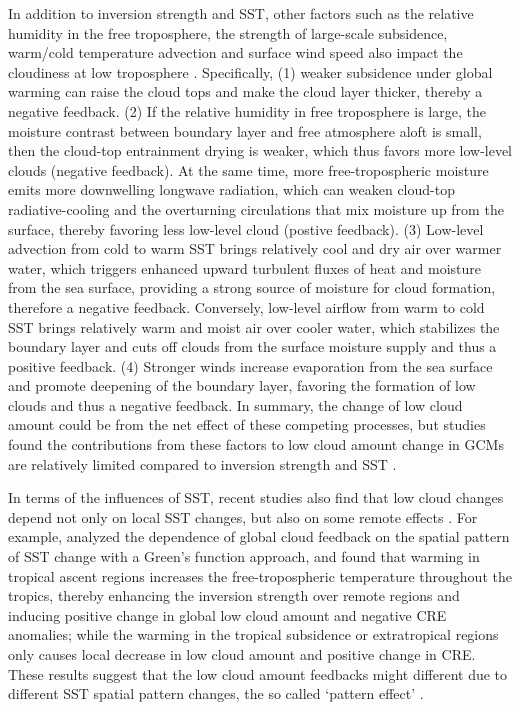 In addition to inversion strength and SST, other factors such as the relative humidity in the free troposphere, the strength of large-scale subsidence, warm/cold temperature advection and surface wind speed also impact the cloudiness at low troposphere \citep[e.g.,][]{Bretherton2015,Scott2020}. Specifically, (1) weaker subsidence under global warming can raise the cloud tops and make the cloud layer thicker, thereby a negative feedback. (2) If the relative humidity in free troposphere is large, the moisture contrast between boundary layer and free atmosphere aloft is small, then the cloud-top entrainment drying is weaker, which thus favors more low-level clouds (negative feedback). At the same time, more free-tropospheric moisture emits more downwelling longwave radiation, which can weaken cloud-top radiative-cooling and the overturning circulations that mix moisture up from the surface, thereby favoring less low-level cloud (postive feedback). (3) Low-level advection from cold to warm SST brings relatively cool and dry air over warmer water, which triggers enhanced upward turbulent fluxes of heat and moisture from the sea surface, providing a strong source of moisture for cloud formation, therefore a negative feedback. Conversely, low-level airflow from warm to cold SST brings relatively warm and moist air over cooler water, which stabilizes the boundary layer and cuts off clouds from the surface moisture supply and thus a positive feedback. (4) Stronger winds increase evaporation from the sea surface and promote deepening of the boundary layer, favoring the formation of low clouds and thus a negative feedback. In summary, the change of low cloud amount could be from the net effect of these competing processes, but studies found the contributions from these factors to low cloud amount change in GCMs are relatively limited compared to inversion strength and SST \citep{Myers2016,Scott2020}.

In terms of the influences of SST, recent studies also find that low cloud changes depend not only on local SST changes, but also on some remote effects \citep[e.g.,][]{Zhou2015,Zhou2016,Zhou2017,Mauritsen2016clouds,Andrews2018}. For example, \cite{Zhou2017} analyzed the dependence of global cloud feedback on the spatial pattern of SST change with a Green's function approach, and found that warming in tropical ascent regions increases the free-tropospheric temperature throughout the tropics, thereby enhancing the inversion strength over remote regions and inducing positive change in global low cloud amount and negative CRE anomalies; while the warming in the tropical subsidence or extratropical regions only causes local decrease in low cloud amount and positive change in CRE. These results suggest that the low cloud amount feedbacks might different due to different SST spatial pattern changes, the so called `pattern effect' \citep[e.g.,][]{Dong2020intermodel}.

